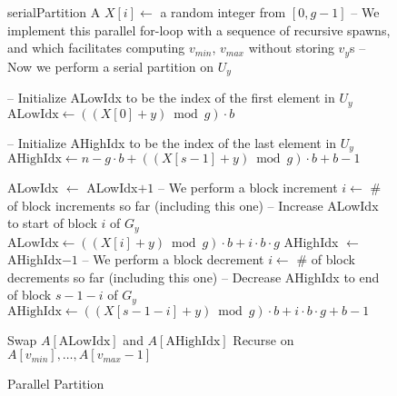 \documentclass[twocolumn, twoside, 11pt]{article}
\newtheorem{lemma}{Lemma}
\begin{document}
\begin{figure*}
	\caption{Parallel Partition}
	\label{alg:parallelPartition}
	\begin{algorithmic}[1]
			\State serialPartition A
		\Else
				\State $X[i] \gets$ a random integer from $[0,g-1]$ 
			\EndFor
			\State -- We implement this parallel for-loop with a sequence of recursive spawns, and which facilitates computing $v_{min}$, $v_{max}$ without storing $v_y$s
				\State -- Now we perform a serial partition on $U_y$

				\State -- Initialize ALowIdx to be the index of the first element in $U_y$
				\State $\text{ALowIdx} \gets ((X[0]+y) \bmod g)\cdot b$

				\State -- Initialize AHighIdx to be the index of the last element in $U_y$
				\State $\text{AHighIdx} \gets n - g\cdot b + ((X[s-1]+y) \bmod g)\cdot b + b-1$

						\State ALowIdx $\gets$ ALowIdx$+1$
							\State -- We perform a block increment
							\State $i \gets $ \# of block increments so far (including this one)
							\State -- Increase ALowIdx to start of block $i$ of $G_y$
							\State $\text{ALowIdx} \gets ((X[i] + y)\bmod g) \cdot b + i\cdot b\cdot g$
						\EndIf
					\EndWhile
						\State AHighIdx $\gets$ AHighIdx$-1$
							\State -- We perform a block decrement
							\State $i \gets $ \# of block decrements so far (including this one)
							\State -- Decrease AHighIdx to end of block $s-1-i$ of $G_y$
							\State $\text{AHighIdx} \gets ((X[s-1-i] + y)\bmod g) \cdot b + i\cdot b\cdot g + b - 1$
						\EndIf
					\EndWhile

					\State Swap $A[\text{ALowIdx}]$ and $A[\text{AHighIdx}]$
				\EndWhile
			\EndFor
			\State Recurse on $A[v_{min}],\ldots,A[v_{max}-1]$
		\EndIf
	\end{algorithmic}	
\end{figure*}

\end{document}
